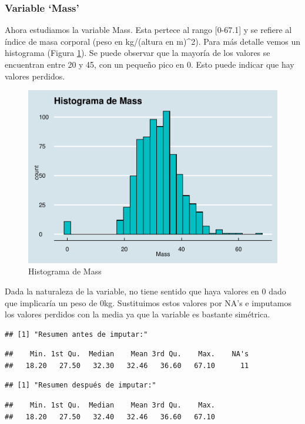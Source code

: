 \documentclass[
]{article}
\begin{document}
\hypertarget{variable-mass}{%
\subsubsection{Variable `Mass'}\label{variable-mass}}

Ahora estudiamos la variable Mass. Esta pertece al rango {[}0-67.1{]} y
se refiere al índice de masa corporal (peso en kg/(altura en m)\^{}2).
Para más detalle vemos un histograma (Figura \ref{fig:hist_mass}). Se
puede observar que la mayoría de los valores se encuentran entre 20 y
45, con un pequeño pico en 0. Esto puede indicar que hay valores
perdidos.

\begin{figure}

{\centering \includegraphics[width=0.5\linewidth]{pima-clasificacion_files/figure-latex/hist_mass-1} 

}

\caption{Histograma de Mass}\label{fig:hist_mass}
\end{figure}

Dada la naturaleza de la variable, no tiene sentido que haya valores en
0 dado que implicaría un peso de 0kg. Sustituimos estos valores por NA's
e imputamos los valores perdidos con la media ya que la variable es
bastante simétrica.

\begin{verbatim}
## [1] "Resumen antes de imputar:"
\end{verbatim}

\begin{verbatim}
##    Min. 1st Qu.  Median    Mean 3rd Qu.    Max.    NA's 
##   18.20   27.50   32.30   32.46   36.60   67.10      11
\end{verbatim}

\begin{verbatim}
## [1] "Resumen después de imputar:"
\end{verbatim}

\begin{verbatim}
##    Min. 1st Qu.  Median    Mean 3rd Qu.    Max. 
##   18.20   27.50   32.40   32.46   36.60   67.10
\end{verbatim}
\end{document}
